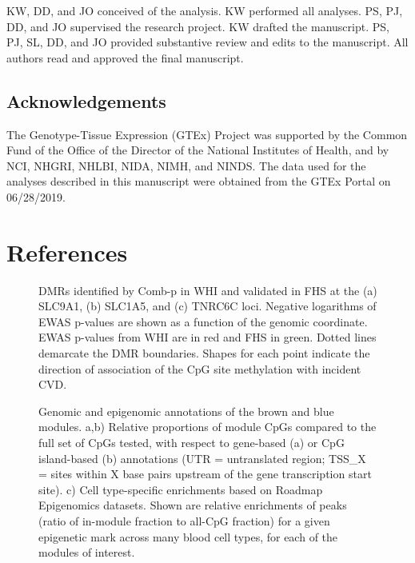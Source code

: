 \documentclass[]{bmcart}
\begin{document}
KW, DD, and JO conceived of the analysis. KW performed all analyses. PS,
PJ, DD, and JO supervised the research project. KW drafted the
manuscript. PS, PJ, SL, DD, and JO provided substantive review and edits
to the manuscript. All authors read and approved the final manuscript.

\subsection{Acknowledgements}\label{acknowledgements}

The Genotype-Tissue Expression (GTEx) Project was supported by the
Common Fund of the Office of the Director of the National Institutes of
Health, and by NCI, NHGRI, NHLBI, NIDA, NIMH, and NINDS. The data used
for the analyses described in this manuscript were obtained from the
GTEx Portal on 06/28/2019.

\section{References}\label{references}


\begin{figure}[htbp]
\centering
\caption{\label{fig:print-combp-plots}DMRs identified by Comb-p in WHI and
validated in FHS at the (a) SLC9A1, (b) SLC1A5, and (c) TNRC6C loci.
Negative logarithms of EWAS p-values are shown as a function of the
genomic coordinate. EWAS p-values from WHI are in red and FHS in green.
Dotted lines demarcate the DMR boundaries. Shapes for each point
indicate the direction of association of the CpG site methylation with
incident CVD.}
\end{figure}

\begin{figure}[htbp]
\centering
\caption{\label{fig:brown-and-blue-plots}Genomic and epigenomic annotations
of the brown and blue modules. a,b) Relative proportions of module CpGs
compared to the full set of CpGs tested, with respect to gene-based (a)
or CpG island-based (b) annotations (UTR = untranslated region; TSS\_X =
sites within X base pairs upstream of the gene transcription start
site). c) Cell type-specific enrichments based on Roadmap Epigenomics
datasets. Shown are relative enrichments of peaks (ratio of in-module
fraction to all-CpG fraction) for a given epigenetic mark across many
blood cell types, for each of the modules of interest.}
\end{figure}
\end{document}
